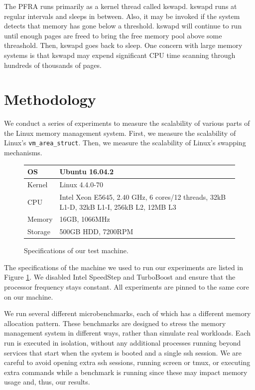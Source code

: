 \documentclass[twocolumn,11pt]{article}
\begin{document}
The PFRA runs primarily as a kernel thread called kswapd. kswapd runs at regular
intervals and sleeps in between. Also, it may be invoked if the system detects
that memory has gone below a threshold. kswapd will continue to run until enough
pages are freed to bring the free memory pool above some threashold. Then,
kswapd goes back to sleep.  One concern with large memory systems is that kswapd
may expend significant CPU time scanning through hundreds of thousands of pages.

\section{Methodology}

We conduct a series of experiments to measure the scalability of various parts
of the Linux memory management system.  First, we measure the scalability of
Linux's \texttt{vm\_area\_struct}. Then, we measure the scalability of Linux's
swapping mechanisms.

\begin{figure}[t]
\centering
\begin{tabular}{|l|p{5cm}|} \hline
OS & Ubuntu 16.04.2 \\ \hline
Kernel & Linux 4.4.0-70 \\ \hline
CPU & Intel Xeon E5645, 2.40 GHz, 6 cores/12 threads, 32kB L1-D, 32kB L1-I,
    256kB L2, 12MB L3 \\ \hline
Memory & 16GB, 1066MHz \\ \hline
Storage & 500GB HDD, 7200RPM \\
\hline
\end{tabular}
\caption{Specifications of our test machine.  \label{fig:specs}}
\end{figure}

The specifications of the machine we used to run our experiments are listed in
Figure \ref{fig:specs}. We disabled Intel SpeedStep and TurboBoost and ensure
that the processor frequency stays constant. All experiments are pinned to the
same core on our machine. 

We run several different microbenchmarks, each of which has a different memory
allocation pattern. These benchmarks are designed to stress the memory
management system in different ways, rather than simulate real workloads. 
Each run is executed in isolation, without any additional processes
running beyond services that start when the system is booted and a single ssh
session. We are careful to avoid opening extra ssh sessions, running screen or
tmux, or executing extra commands while a benchmark is running since these may
impact memory usage and, thus, our results.
\end{document}
